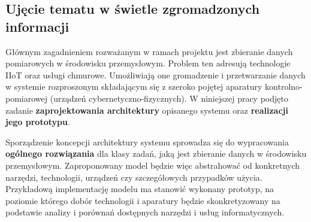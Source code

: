 \documentclass[a4paper, 12pt, twoside]{article}
\begin{document}
\subsection{Ujęcie tematu w świetle zgromadzonych informacji}

Głównym zagadnieniem rozważanym
w ramach projektu jest zbieranie danych pomiarowych w środowisku
przemysłowym. Problem ten adresują technologie IIoT oraz usługi chmurowe.
Umożliwiają one gromadzenie i przetwarzanie danych w systemie rozproszonym składającym
się z szeroko pojętej aparatury kontrolno-pomiarowej (urządzeń cybernetyczno-fizycznych).
W niniejszej pracy podjęto zadanie \textbf{zaprojektowania architektury} opisanego systemu
oraz \textbf{realizacji jego prototypu}.

Sporządzenie koncepcji architektury systemu sprowadza się do wypracowania
\textbf{ogólnego rozwiązania} dla klasy zadań, jaką jest zbieranie danych w środowisku przemysłowym.
Zaproponowany model będzie więc abstrahować od konkretnych narzędzi, technologii,
urządzeń czy szczegółowych przypadków użycia. Przykładową implementację modelu ma
stanowić wykonany prototyp, na poziomie którego dobór technologii
i aparatury będzie skonkretyzowany na podstawie analizy i porównań dostępnych
narzędzi i usług informatycznych.
\end{document}
